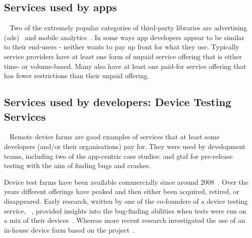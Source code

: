 \subsection{Services used by apps}~\label{rw-services-used-by-apps-topic}
Two of the extremely popular categories of third-party libraries are advertising (ads)~ and mobile analytics~.
In some ways app developers appear to be similar to their end-users - neither wants to pay up front for what they use.%
Typically service providers have at least one form of unpaid service offering that is either time- or volume-based. Many also have at least one paid-for service offering that has fewer restrictions than their unpaid offering.


\subsection{Services used by developers: Device Testing Services}~\label{rw-services-used-by-devs-device-testing-services}
Remote device farms are good examples of services that at least some developers (and/or their organisations) pay for. They were used by development teams, including two of the app-centric case studies:  and \Gls{gtaf} for pre-release testing with the aim of finding bugs and crashes.

Device test farms have been available commercially since around 2008~. Over the years different offerings have peaked and then either been acquired, retired, or disappeared.
Early research, written by one of the co-founders of a device testing service, ~, provided insights into the bug-finding abilities when tests were run on a mix of their devices~. Whereas more recent research investigated the use of an in-house device farm based on the  project~. 

